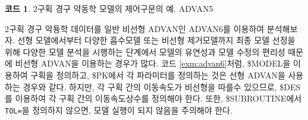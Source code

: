 \documentclass[
  10pt,
  krantz2,
  a4paper]{krantz}
\theoremstyle{definition}
\theoremstyle{definition}
\newtheorem{example}{코드}[chapter]
\theoremstyle{definition}
\theoremstyle{remark}
\begin{document}
\begin{example}
\protect\hypertarget{exm:advan5}{}{\label{exm:advan5} }2구획 경구 약동학 모델의 제어구문의 예. ADVAN5
\end{example}

2구획 경구 악둉학 데이터를 일반 비선형 ADVAN인 ADVAN6를 이용하여 분석해보자. 선형 모델에서부터 다양한 흡수모델 또는 비선형 제거모델까지 최종 모델 선정을 위해 다양한 모델 분석을 시행하는 단계에서 모델의 유연성과 모델 수정의 편리성 때문에 비선형 ADVAN을 이용하는 경우가 많다. 코드 \ref{exm:advan6}처럼, \$MODEL을 이용하여 구획을 정의하고, \$PK에서 각 파라미터를 정의하는 것은 선형 ADVAN을 사용하는 경우와 같다. 하지만, 각 구획 간의 이동속도가 비선형을 따를수 있으므로, \$DES를 이용하여 각 구획 간의 이동속도상수를 정의해야 한다. 또한, \$SUBROUTINE에서 \texttt{TOL=}을 정의하지 않으면, 모델 실행이 되지 않음을 주의해야 한다.
\end{document}

